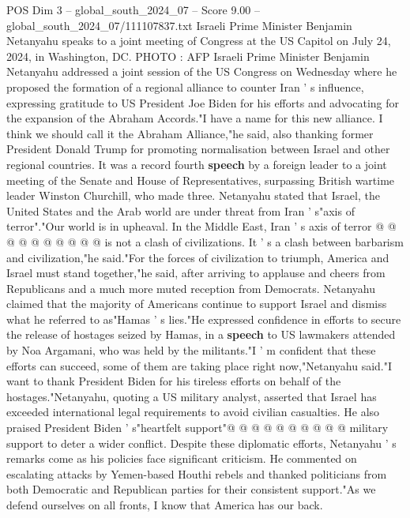 \begin{textsample}{POS Dim 3 – global\_south\_2024\_07 – Score 9.00 – global\_south\_2024\_07/111107837.txt}  \label{ex:f3_pos_312}
Israeli Prime Minister Benjamin Netanyahu speaks to a joint meeting of Congress at the US Capitol on July 24, 2024, in Washington, DC.
PHOTO : AFP Israeli Prime Minister Benjamin Netanyahu addressed a joint session of the US Congress on Wednesday where he proposed the formation of a regional alliance to counter Iran ' s influence, expressing gratitude to US President Joe Biden for his efforts and advocating for the expansion of the Abraham Accords."I have a name for this new alliance.
I think we should call it the Abraham Alliance,"he said, also thanking former President Donald Trump for promoting normalisation between Israel and other regional countries.
It was a record fourth \textbf{speech} by a foreign leader to a joint meeting of the Senate and House of Representatives, surpassing British wartime leader Winston Churchill, who made three.
Netanyahu stated that Israel, the United States and the Arab world are under threat from Iran ' s"axis of terror"."Our world is in upheaval.
In the Middle East, Iran ' s axis of terror @ @ @ @ @ @ @ @ @ @ is not a clash of civilizations.
It ' s a clash between barbarism and civilization,"he said."For the forces of civilization to triumph, America and Israel must stand together,"he said, after arriving to applause and cheers from Republicans and a much more muted reception from Democrats.
Netanyahu claimed that the majority of Americans continue to support Israel and dismiss what he referred to as"Hamas ' s lies."He expressed confidence in efforts to secure the release of hostages seized by Hamas, in a \textbf{speech} to US lawmakers attended by Noa Argamani, who was held by the militants."I ' m confident that these efforts can succeed, some of them are taking place right now,"Netanyahu said."I want to thank President Biden for his tireless efforts on behalf of the hostages."Netanyahu, quoting a US military analyst, asserted that Israel has exceeded international legal requirements to avoid civilian casualties.
He also praised President Biden ' s"heartfelt support"@ @ @ @ @ @ @ @ @ @ military support to deter a wider conflict.
Despite these diplomatic efforts, Netanyahu ' s remarks come as his policies face significant criticism.
He commented on escalating attacks by Yemen-based Houthi rebels and thanked politicians from both Democratic and Republican parties for their consistent support."As we defend ourselves on all fronts, I know that America has our back.

\end{textsample}

